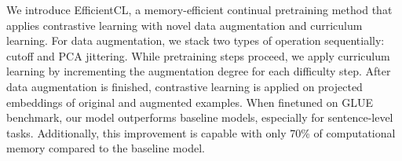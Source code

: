 We introduce EfficientCL, a memory-efficient continual pretraining method that applies contrastive learning with novel data augmentation and curriculum learning. For data augmentation, we stack two types of operation sequentially: cutoff and PCA jittering. While pretraining steps proceed, we apply curriculum learning by incrementing the augmentation degree for each difficulty step. After data augmentation is finished, contrastive learning is applied on projected embeddings of original and augmented examples. When finetuned on GLUE benchmark, our model outperforms baseline models, especially for sentence-level tasks. Additionally, this improvement is capable with only 70\% of computational memory compared to the baseline model.
